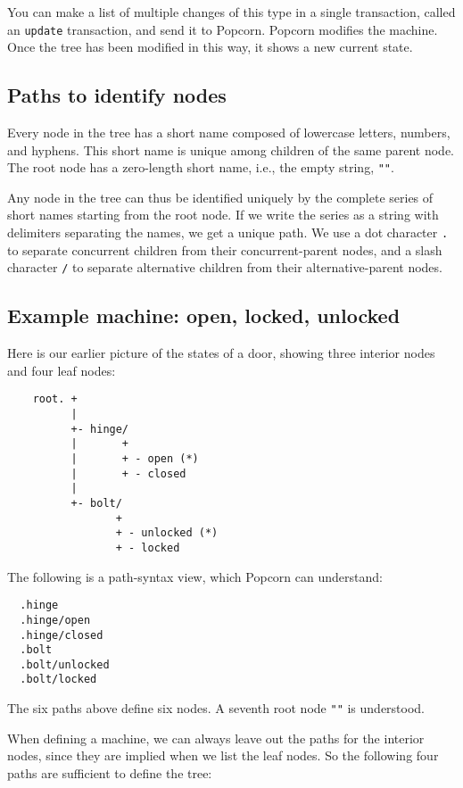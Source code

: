 \documentclass[12pt]{article}
\begin{document}
You can make a list of multiple changes of this type in a single
transaction, called an \verb`update` transaction, and send it to Popcorn.
Popcorn modifies the machine.  Once the tree has been modified in this
way, it shows a new current state.

\subsection{Paths to identify nodes}

Every node in the tree has a short name composed of lowercase letters,
numbers, and hyphens. This short name is unique among children of the
same parent node. The root node has a zero-length short name, i.e.,
the empty string, \verb`""`.

Any node in the tree can thus be identified uniquely by the complete
series of short names starting from the root node. If we write the
series as a string with delimiters separating the names, we get a
unique path. We use a dot character \verb`.` to separate concurrent
children from their concurrent-parent nodes, and a slash character \verb`/`
to separate alternative children from their alternative-parent
nodes.

\subsection{Example machine: open, locked, unlocked}

Here is our earlier picture of the states of a door, showing three
interior nodes and four leaf nodes:

\begin{verbatim}
    root. +
          |
          +- hinge/
          |       +
          |       + - open (*)
          |       + - closed
          |
          +- bolt/
                 +
                 + - unlocked (*)
                 + - locked
\end{verbatim}

The following is a path-syntax view, which Popcorn can understand:

\begin{verbatim}
  .hinge
  .hinge/open
  .hinge/closed
  .bolt
  .bolt/unlocked
  .bolt/locked
\end{verbatim}

The six paths above define six nodes.  A seventh root node \verb`""` is
understood.

When defining a machine, we can always leave out the paths for the
interior nodes, since they are implied when we list the leaf nodes. So
the following four paths are sufficient to define the tree:
\end{document}
